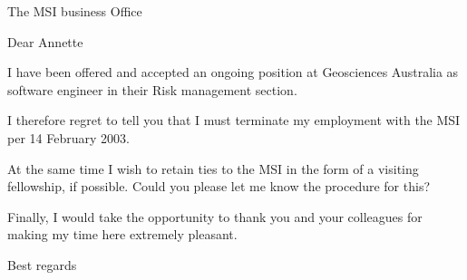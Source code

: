 \documentclass[12pt]{letter}
\begin{document}
\address{       Dr.\ Ole M{\o}ller Nielsen     \\
                Mathematical Sciences Institute   \\
                Australian National University \\
                Canberra, ACT 0200     \\
                Ph: +61 2 6125 3873 \\
                email: Ole.Nielsen@anu.edu.au}


\signature{Ole M{\o}ller Nielsen}

\begin{letter}
{The MSI business Office} 

\opening{Dear Annette}
 


I have been offered and accepted an ongoing position at Geosciences Australia
as software engineer in their Risk management section.

I therefore regret to tell you that I must terminate my
employment with the MSI per 14 February 2003.

At the same time I wish to retain ties to the MSI in the form of a 
visiting fellowship, if possible. Could you please let me know 
the procedure for this?

Finally, I would take the opportunity to thank you and your colleagues for
making my time here extremely pleasant. 


\vspace{1cm}
\closing{Best regards}

\end{letter}
\end{document}
